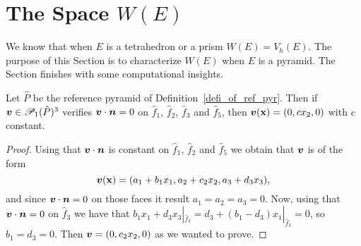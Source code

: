 \section{The Space $W(E)$}
We know that when $E$ is a tetrahedron or a prism $W(E)=V_h(E)$. The purpose of this Section is to characterize $W(E)$ when $E$ is a pyramid. The Section finishes with some computational insights. 
\begin{lemma}\label{L3}
Let $\hat P$ be the reference pyramid 
of Definition~\ref{defi_of_ref_pyr}.
Then if $\boldsymbol{v} \in\mathcal P_1(\hat P)^3$ verifies $\boldsymbol{v} \cdot \boldsymbol{n} =0$ on $\hat f_1$, $\hat f_2$, $\hat f_3$ and
$\hat f_5$, then $\boldsymbol{v}({\bf x})=(0,cx_2,0)$ with $c$ constant.
\end{lemma}
\begin{proof}
Using that $\boldsymbol{v}\cdot\boldsymbol{n}$ is constant on $\hat f_1$, $\hat f_2$ and
$\hat f_5$ we obtain that $\boldsymbol{v}$ is of the form
\[
\boldsymbol{v}({\bf x}) = (a_1+b_1x_1, a_2+c_2x_2,a_3+d_3x_3),
\]
and since $\boldsymbol{v}\cdot\boldsymbol{n}=0$ on those faces it result
$a_1=a_2=a_3=0$. Now, using that $\boldsymbol{v}\cdot\boldsymbol{n}=0$ on
$\hat f_3$  we have that $b_1x_1+d_3x_3|_{\hat f_3}=d_3+(b_1-d_3)x_1|_{\hat f_3}=0$,
so $b_1=d_3=0$. Then $\boldsymbol{v}=(0,c_2x_2,0)$ as we wanted to prove.
\end{proof}

